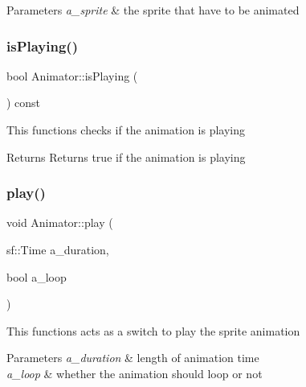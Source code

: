 \begin{DoxyParams}{Parameters}
{\em a\+\_\+sprite} & the sprite that have to be animated \\
\hline
\end{DoxyParams}
\mbox{\label{class_animator_af652cfa1671a9a8155f85b2b33f65a17}} 
\subsubsection{\texorpdfstring{is\+Playing()}{isPlaying()}}
{\footnotesize\ttfamily bool Animator\+::is\+Playing (\begin{DoxyParamCaption}{ }\end{DoxyParamCaption}) const}

This functions checks if the animation is playing

\begin{DoxyReturn}{Returns}
Returns true if the animation is playing 
\end{DoxyReturn}
\mbox{\label{class_animator_a8220e9ec75ce8e3425e8ca44c309f700}} 
\subsubsection{\texorpdfstring{play()}{play()}}
{\footnotesize\ttfamily void Animator\+::play (\begin{DoxyParamCaption}\item[{sf\+::\+Time}]{a\+\_\+duration,  }\item[{bool}]{a\+\_\+loop }\end{DoxyParamCaption})}

This functions acts as a switch to play the sprite animation


\begin{DoxyParams}{Parameters}
{\em a\+\_\+duration} & length of animation time \\
\hline
{\em a\+\_\+loop} & whether the animation should loop or not \\
\hline
\end{DoxyParams}
\mbox{\label{class_animator_a79c476575fc1e1c50e8f119be6806cf0}} 
